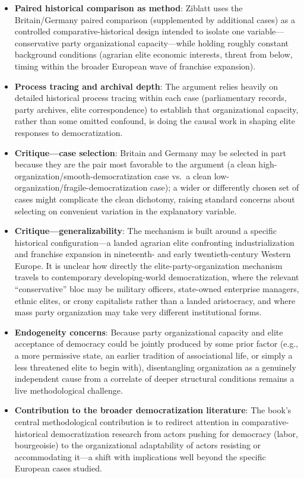 \documentclass[12pt]{article}
\begin{document}
\begin{itemize}[leftmargin=*, itemsep=4pt]
    \item \textbf{Paired historical comparison as method}: Ziblatt uses the Britain/Germany paired comparison (supplemented by additional cases) as a controlled comparative-historical design intended to isolate one variable---conservative party organizational capacity---while holding roughly constant background conditions (agrarian elite economic interests, threat from below, timing within the broader European wave of franchise expansion).
    \item \textbf{Process tracing and archival depth}: The argument relies heavily on detailed historical process tracing within each case (parliamentary records, party archives, elite correspondence) to establish that organizational capacity, rather than some omitted confound, is doing the causal work in shaping elite responses to democratization.
    \item \textbf{Critique---case selection}: Britain and Germany may be selected in part because they are the pair most favorable to the argument (a clean high-organization/smooth-democratization case vs.\ a clean low-organization/fragile-democratization case); a wider or differently chosen set of cases might complicate the clean dichotomy, raising standard concerns about selecting on convenient variation in the explanatory variable.
    \item \textbf{Critique---generalizability}: The mechanism is built around a specific historical configuration---a landed agrarian elite confronting industrialization and franchise expansion in nineteenth- and early twentieth-century Western Europe. It is unclear how directly the elite-party-organization mechanism travels to contemporary developing-world democratization, where the relevant ``conservative'' bloc may be military officers, state-owned enterprise managers, ethnic elites, or crony capitalists rather than a landed aristocracy, and where mass party organization may take very different institutional forms.
    \item \textbf{Endogeneity concerns}: Because party organizational capacity and elite acceptance of democracy could be jointly produced by some prior factor (e.g., a more permissive state, an earlier tradition of associational life, or simply a less threatened elite to begin with), disentangling organization as a genuinely independent cause from a correlate of deeper structural conditions remains a live methodological challenge.
    \item \textbf{Contribution to the broader democratization literature}: The book's central methodological contribution is to redirect attention in comparative-historical democratization research from actors pushing for democracy (labor, bourgeoisie) to the organizational adaptability of actors resisting or accommodating it---a shift with implications well beyond the specific European cases studied.
\end{itemize}
\end{document}
